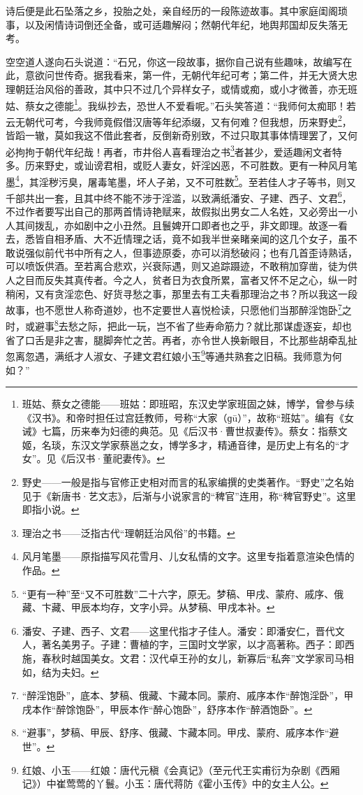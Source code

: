 \par 诗后便是此石坠落之乡，投胎之处，亲自经历的一段陈迹故事。其中家庭闺阁琐事，以及闲情诗词倒还全备，或可适趣解闷；然朝代年纪，地舆邦国却反失落无考。
\par 空空道人遂向石头说道：“石兄，你这一段故事，据你自己说有些趣味，故编写在此，意欲问世传奇。据我看来，第一件，无朝代年纪可考；第二件，并无大贤大忠理朝廷治风俗的善政，其中只不过几个异样女子，或情或痴，或小才微善，亦无班姑、蔡女之德能\footnote{班姑、蔡女之德能——班姑：即班昭，东汉史学家班固之妹，博学，曾参与续《汉书》。和帝时担任过宫廷教师，号称“大家（ɡū）”，故称“班姑”。编有《女诫》七篇，历来奉为妇德的典范。见《后汉书·曹世叔妻传》。蔡女：指蔡文姬，名琰，东汉文学家蔡邕之女，博学多才，精通音律，是历史上有名的“才女”。见《后汉书·董祀妻传》。}。我纵抄去，恐世人不爱看呢。”石头笑答道：“我师何太痴耶！若云无朝代可考，今我师竟假借汉唐等年纪添缀，又有何难？但我想，历来野史\footnote{野史——一般是指与官修正史相对而言的私家编撰的史类著作。“野史”之名始见于《新唐书·艺文志》，后渐与小说家言的“稗官”连用，称“稗官野史”。这里即指小说。}，皆蹈一辙，莫如我这不借此套者，反倒新奇别致，不过只取其事体情理罢了，又何必拘拘于朝代年纪哉！再者，市井俗人喜看理治之书\footnote{理治之书——泛指古代“理朝廷治风俗”的书籍。}者甚少，爱适趣闲文者特多。历来野史，或讪谤君相，或贬人妻女，奸淫凶恶，不可胜数。更有一种风月笔墨\footnote{风月笔墨——原指描写风花雪月、儿女私情的文字。这里专指着意渲染色情的作品。}，其淫秽污臭，屠毒笔墨，坏人子弟，又不可胜数\footnote{“更有一种”至“又不可胜数”二十六字，原无。梦稿、甲戌、蒙府、戚序、俄藏、卞藏、甲辰本均存，文字小异。从梦稿、甲戌本补。}。至若佳人才子等书，则又千部共出一套，且其中终不能不涉于淫滥，以致满纸潘安、子建、西子、文君\footnote{潘安、子建、西子、文君——这里代指才子佳人。潘安：即潘安仁，晋代文人，著名美男子。子建：曹植的字，三国时文学家，以才高著称。西子：即西施，春秋时越国美女。文君：汉代卓王孙的女儿，新寡后“私奔”文学家司马相如，结为夫妇。}，不过作者要写出自己的那两首情诗艳赋来，故假拟出男女二人名姓，又必旁出一小人其间拨乱，亦如剧中之小丑然。且鬟婢开口即者也之乎，非文即理。故逐一看去，悉皆自相矛盾、大不近情理之话，竟不如我半世亲睹亲闻的这几个女子，虽不敢说强似前代书中所有之人，但事迹原委，亦可以消愁破闷；也有几首歪诗熟话，可以喷饭供酒。至若离合悲欢，兴衰际遇，则又追踪蹑迹，不敢稍加穿凿，徒为供人之目而反失其真传者。今之人，贫者日为衣食所累，富者又怀不足之心，纵一时稍闲，又有贪淫恋色、好货寻愁之事，那里去有工夫看那理治之书？所以我这一段故事，也不愿世人称奇道妙，也不定要世人喜悦检读，只愿他们当那醉淫饱卧\footnote{“醉淫饱卧”，底本、梦稿、俄藏、卞藏本同。蒙府、戚序本作“醉饱淫卧”，甲戌本作“醉馀饱卧”，甲辰本作“醉心饱卧”，舒序本作“醉酒饱卧”。}之时，或避事\footnote{“避事”，梦稿、甲辰、舒序、俄藏、卞藏本同。甲戌、蒙府、戚序本作“避世”。}去愁之际，把此一玩，岂不省了些寿命筋力？就比那谋虚逐妄，却也省了口舌是非之害，腿脚奔忙之苦。再者，亦令世人换新眼目，不比那些胡牵乱扯忽离忽遇，满纸才人淑女、子建文君红娘小玉\footnote{ 红娘、小玉——红娘：唐代元稹《会真记》（至元代王实甫衍为杂剧《西厢记》）中崔莺莺的丫鬟。小玉：唐代蒋防《霍小玉传》中的女主人公。}等通共熟套之旧稿。我师意为何如？”
